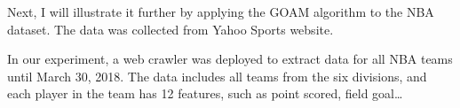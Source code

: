 \documentclass[
 size=14pt,
 paper=smartboard,  %
 mode=present, 		%
 display=slides, 	%
 style=tuliplab,  	%
 pauseslide,
 fleqn,leqno]{powerdot}
\begin{document}


\begin{note}
Next,
I will illustrate it further by applying the GOAM algorithm to the NBA dataset.
The data was collected from Yahoo Sports website.

In our experiment,
a web crawler was deployed to extract data
for all NBA teams until March 30, 2018.
The data includes all teams from the six divisions,
and each player in the team has 12 features,
such as point scored, field goal\dots
\end{note}





\end{document}
